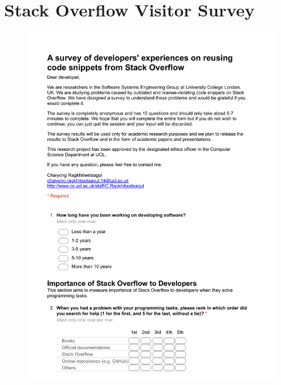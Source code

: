 \documentclass{svjour3}                     %
\begin{document}
\section{Stack Overflow Visitor Survey}
\begin{figure}[H]
	\centering
	\includegraphics[width=0.85\linewidth]{visitor-1}
	\label{fig:visitor-1}
\end{figure}
\end{document}
